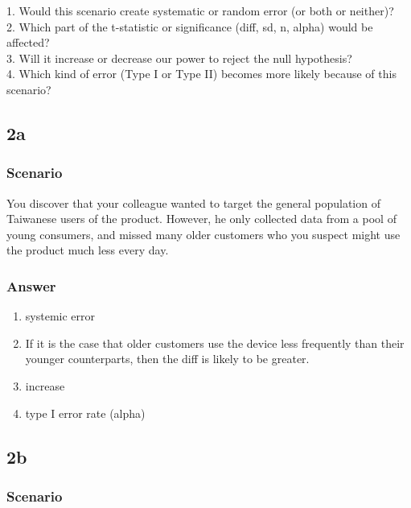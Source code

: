 \documentclass[
]{article}
\providecommand{\tightlist}{%
  \setlength{\itemsep}{0pt}\setlength{\parskip}{0pt}}
\begin{document}
1. Would this scenario create systematic or random error (or both or
neither)?\\
2. Which part of the t-statistic or significance (diff, sd, n, alpha)
would be affected?\\
3. Will it increase or decrease our power to reject the null
hypothesis?\\
4. Which kind of error (Type I or Type II) becomes more likely because
of this scenario?

\hypertarget{a-1}{%
\subsection{2a}\label{a-1}}

\hypertarget{scenario}{%
\subsubsection{\texorpdfstring{\textbf{Scenario}}{Scenario}}\label{scenario}}

You discover that your colleague wanted to target the general population
of Taiwanese users of the product. However, he only collected data from
a pool of young consumers, and missed many older customers who you
suspect might use the product much less every day.

\hypertarget{answer}{%
\subsubsection{\texorpdfstring{\textbf{Answer}}{Answer}}\label{answer}}

\begin{enumerate}
\def\labelenumi{\arabic{enumi}.}
\tightlist
\item
  systemic error
\item
  If it is the case that older customers use the device less frequently
  than their younger counterparts, then the diff is likely to be
  greater.
\item
  increase
\item
  type I error rate (alpha)
\end{enumerate}

\hypertarget{b-1}{%
\subsection{2b}\label{b-1}}

\hypertarget{scenario-1}{%
\subsubsection{\texorpdfstring{\textbf{Scenario}}{Scenario}}\label{scenario-1}}
\end{document}
